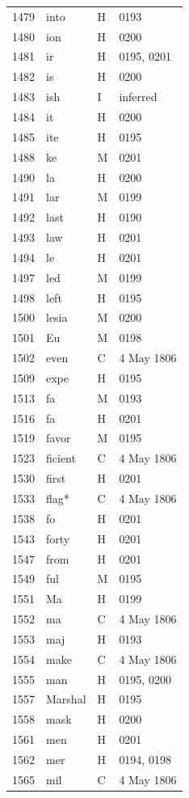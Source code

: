 \begin{longtable}{@{}rlll@{}}
1479 & into & H & 0193 \\
1480 & ion & H & 0200 \\
1481 & ir & H & 0195, 0201 \\
1482 & is & H & 0200 \\
1483 & ish & I & inferred \\
1484 & it & H & 0200 \\
1485 & ite & H & 0195 \\
1488 & ke & M & 0201 \\
1490 & la & H & 0200 \\
1491 & lar & M & 0199 \\
1492 & last & H & 0190 \\
1493 & law & H & 0201 \\
1494 & le & H & 0201 \\
1497 & led & M & 0199 \\
1498 & left & H & 0195 \\
1500 & lesia & M & 0200 \\
1501 & Eu & M & 0198 \\
1502 & even & C & 4 May 1806 \\
1509 & expe & H & 0195 \\
1513 & fa & M & 0193 \\
1516 & fa & H & 0201 \\
1519 & favor & M & 0195 \\
1523 & ficient & C & 4 May 1806 \\
1530 & first & H & 0201 \\
1533 & flag* & C & 4 May 1806 \\
1538 & fo & H & 0201 \\
1543 & forty & H & 0201 \\
1547 & from & H & 0201 \\
1549 & ful & M & 0195 \\
1551 & Ma & H & 0199 \\
1552 & ma & C & 4 May 1806 \\
1553 & maj & H & 0193 \\
1554 & make & C & 4 May 1806 \\
1555 & man & H & 0195, 0200 \\
1557 & Marshal & H & 0195 \\
1558 & mask & H & 0200 \\
1561 & men & H & 0201 \\
1562 & mer & H & 0194, 0198 \\
1565 & mil & C & 4 May 1806 \\

\end{longtable}
